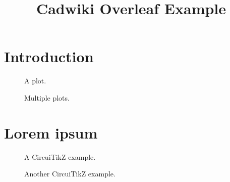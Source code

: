 \documentclass[conference]{IEEEtran}
\begin{document}


\title{Cadwiki Overleaf Example}


\author{
}

\maketitle


\begin{abstract}
\lipsum[1]
\end{abstract}


\section{Introduction}
\label{section_intro}

\lipsum[2-5]

\begin{figure}[!t]
\centering

\caption{A plot.}
\label{fig_single}
\vspace{-0.4em}
\end{figure}

\begin{figure}[!t]
\centering

\caption{Multiple plots.}
\label{fig_multi}
\vspace{-0.4em}
\end{figure}


\section{Lorem ipsum}
\label{section_lorem_ipsum}

\lipsum[6-8]

\begin{figure}[!t]
\centering

\caption{A CircuiTikZ example.}
\label{fig_mixer}
\vspace{-0.4em}
\end{figure}

\begin{figure}[!t]
\centering

\caption{Another CircuiTikZ example.}
\label{fig_rx}
\vspace{-0.4em}
\end{figure}
\end{document}
